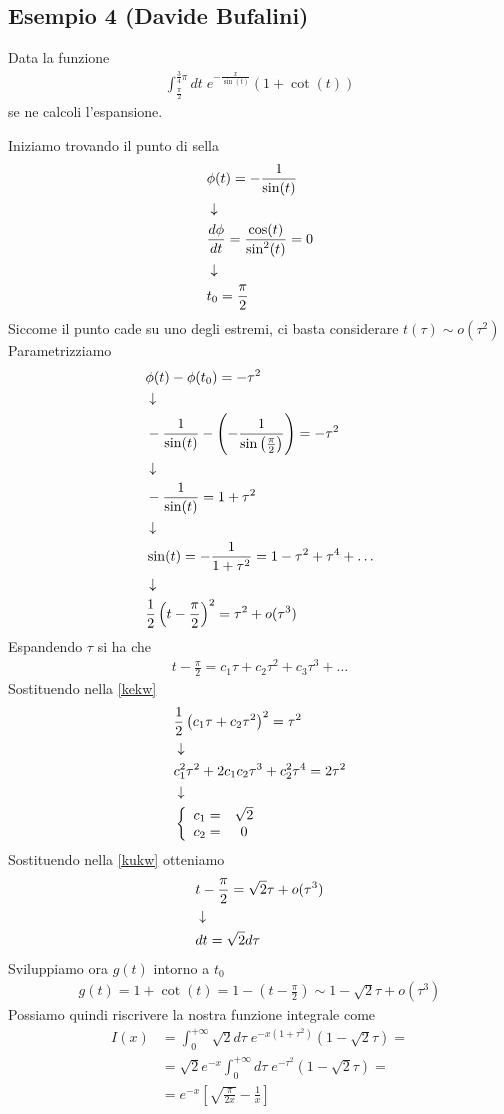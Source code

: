 \newpage

\subsection{Esempio 4 (Davide Bufalini)}

Data la funzione
\begin{align}
	\int_{\frac{\pi}{2}}^{\frac{3}{4}\pi} dt \; e^{-\frac{x}{\sin(t)}} (1 + \cot (t))
\end{align}
se ne calcoli l'espansione.

Iniziamo trovando il punto di sella
\begin{align}
	&\phi(t) = -\frac{1}{\sin(t)}\\ &\downarrow \nonumber \\
	&\frac{d\phi}{dt} = \frac{\cos (t)}{\sin^2 (t)} = 0 \\ &\downarrow \nonumber \\
	& t_0 = \frac{\pi}{2}
\end{align}
Siccome il punto cade su uno degli estremi, ci basta considerare $t(\tau) \sim o(\tau^2)$
Parametrizziamo
\begin{align}
	&\phi(t) - \phi(t_0) = -\tau^2\\ &\downarrow \nonumber \\
	&-\frac{1}{\sin (t)}-\left(-\frac{1}{\sin \left( \frac{\pi}{2}\right)}\right) = -\tau^2 \nonumber \\ &\downarrow \nonumber \\
	&-\frac{1}{\sin (t)} = 1 +\tau^2\nonumber \\ &\downarrow \nonumber \\
	&\sin (t) = -\frac{1}{1+\tau^2} = 1 - \tau^2 + \tau^4 + \dots \nonumber \\ &\downarrow \nonumber \\
	&\frac{1}{2} \left( t -\frac{\pi}{2} \right)^2 = \tau^2 + o(\tau^3) \label{kekw}
\end{align}
Espandendo $\tau$ si ha che
\begin{align}
	t -\frac{\pi}{2} = c_1 \tau + c_2 \tau^2 + c_3 \tau^3 + \dots \label{kukw}
\end{align}
Sostituendo nella \ref{kekw}
\begin{align}
	&\frac{1}{2} \left( c_1 \tau + c_2 \tau^2 \right)^2 = \tau^2 \\ &\downarrow \nonumber \\
	&c_1^2 \tau^2 + 2c_1 c_2 \tau^3 + c_2^2 \tau^4 = 2 \tau^2\nonumber \\ &\downarrow \nonumber \\
	&\left\{ \begin{array}{cc} c_1 = &\sqrt{2}\\ c_2 = &0 \end{array} \right.
\end{align}
Sostituendo nella \ref{kukw} otteniamo
\begin{align}
	&t -\frac{\pi}{2} = \sqrt{2}\tau + o(\tau^3)	\\ &\downarrow \nonumber \\
	&dt = \sqrt{2}d\tau
\end{align}
Sviluppiamo ora $g(t)$ intorno a $t_0$
\begin{align}
	g(t) = 1 + \cot(t) = 1 - \left( t -\frac{\pi}{2} \right) \sim 1 - \sqrt{2}\tau +o(\tau^3)
\end{align}
Possiamo quindi riscrivere la nostra funzione integrale come
\begin{align}
	I(x) &= \int_{0}^{+\infty} \sqrt{2} d\tau \; e^{-x(1+\tau^2)}(1 - \sqrt{2}\tau) = \nonumber\\
	&= \sqrt{2}e^{-x} \int_{0}^{+\infty}  d\tau \; e^{-\tau^2}(1 - \sqrt{2}\tau) = \nonumber\\
	&=e^{-x} \left[ \sqrt{\frac{\pi}{2x}} - \frac{1}{x} \right]
\end{align}


